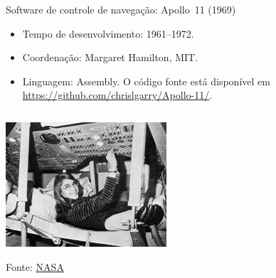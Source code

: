 \begin{frame}{Software de controle de navegação: Apollo~11 (1969)}
  \footnotesize
  \begin{itemize}
  \item Tempo de desenvolvimento: 1961--1972.
  \item Coordenação: Margaret Hamilton, MIT.
  \item Linguagem: Assembly. O código fonte está disponível em  \url{https://github.com/chrislgarry/Apollo-11/}.
  \end{itemize}

  \begin{columns}
    \begin{column}{.5\textwidth}
     \includegraphics[scale=.6]{img/margaret-in-action.png}      

      \vfill
      {\tiny Fonte: \href{https://en.wikipedia.org/wiki/File:Margaret_Hamilton.gif}{NASA}}
  
  \end{column}
\end{columns}
\end{frame}

